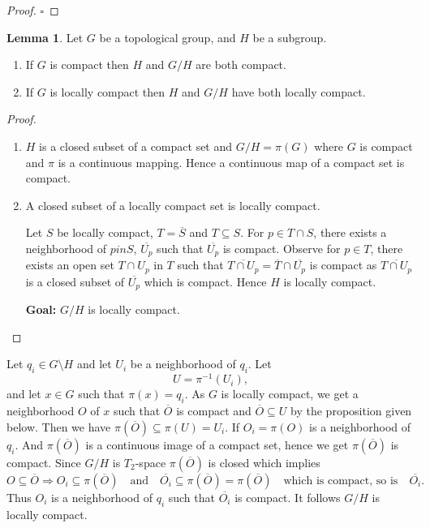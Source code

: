 \documentclass[11pt]{article}
\theoremstyle{definition}
\newtheorem{lemma}{Lemma}[section]
\theoremstyle{remark}
\begin{document}
\begin{proof}
$\square$
\end{proof}

\begin{lemma}
Let $G$ be a topological group, and $H$ be a subgroup.
\begin{enumerate}
    \item[(a)] If $G$ is compact then $H$ and $G/H$ are both compact.
    \item[(b)] If $G$ is locally compact then $H$ and $G/H$ have both locally compact.
\end{enumerate}
\end{lemma}

\begin{proof}
\begin{enumerate}
    \item[(a)] $H$ is a closed subset of a compact set and $G/H = \pi(G)$ where $G$ is compact and $\pi$ is a continuous mapping. Hence a continuous map of a compact set is compact.

    \item[(b)] A closed subset of a locally compact set is locally compact.

    Let $S$ be locally compact, $T = \overline{S}$ and $T \subseteq S$. For $p \in T \cap S$, there exists a neighborhood of $p in S$, $\overline{U_p}$ such that $\overline{U_p}$ is compact. Observe for $p \in T$, there exists an open set $T \cap U_p$ in $T$ such that $\overline{T \cap U_p} = \overline{T} \cap \overline{U_p}$ is compact as $\overline{T \cap U_p}$ is a closed subset of $\overline{U_p}$ which is compact. Hence $H$ is locally compact.

    \textbf{Goal:} $G/H$ is locally compact.
\end{enumerate}
\end{proof}

Let $q_i \in G \setminus H$ and let $U_i$ be a neighborhood of $q_i$. Let
\[ U = \pi^{-1}(U_i), \]
and let $x \in G$ such that $\pi(x) = q_i$. As $G$ is locally compact, we get a neighborhood $O$ of $x$ such that $\overline{O}$ is compact and $\overline{O} \subseteq U$ by the proposition given below. Then we have $\pi(\overline{O}) \subseteq \pi(U) = U_i$. If $O_i = \pi(O)$ is a neighborhood of $q_i$. And $\pi(\overline{O})$ is a continuous image of a compact set, hence we get $\pi(\overline{O})$ is compact. Since $G/H$ is $T_2$-space $\pi(\overline{O})$ is closed which implies
\[ O \subseteq \overline{O} \Rightarrow O_i \subseteq \pi(\overline{O}) \quad \text{and} \quad \overline{O_i} \subseteq \pi(\overline{O}) = \pi(\overline{O}) \quad \text{which is compact, so is} \quad \overline{O_i}. \]
Thus $O_i$ is a neighborhood of $q_i$ such that $\overline{O_i}$ is compact. It follows $G/H$ is locally compact.
\end{document}

